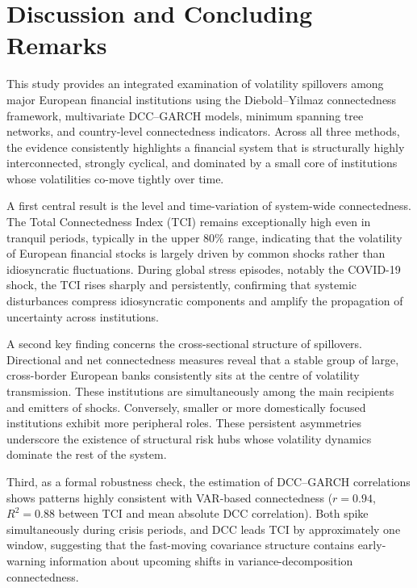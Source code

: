 \section{Discussion and Concluding Remarks}\label{sec:concl}

This study provides an integrated examination of volatility spillovers among major
European financial institutions using the Diebold--Yilmaz connectedness framework,
multivariate DCC--GARCH models, minimum spanning tree networks, and country-level
connectedness indicators. Across all three methods, the evidence consistently highlights
a financial system that is structurally highly interconnected, strongly cyclical, and
dominated by a small core of institutions whose volatilities co-move tightly over time.

A first central result is the level and time-variation of system-wide connectedness. The
Total Connectedness Index (TCI) remains exceptionally high even in tranquil periods,
typically in the upper $80\%$ range, indicating that the volatility of European financial
stocks is largely driven by common shocks rather than idiosyncratic fluctuations. During
global stress episodes, notably the COVID-19 shock, the TCI rises sharply and
persistently, confirming that systemic disturbances compress idiosyncratic components and
amplify the propagation of uncertainty across institutions.

A second key finding concerns the cross-sectional structure of spillovers. Directional
and net connectedness measures reveal that a stable group of large, cross-border European
banks consistently sits at the centre of volatility transmission. These institutions are
simultaneously among the main recipients and emitters of shocks. Conversely, smaller or
more domestically focused institutions exhibit more peripheral roles. These persistent
asymmetries underscore the existence of structural risk hubs whose volatility dynamics
dominate the rest of the system.

Third, as a formal robustness check, the estimation of DCC--GARCH correlations shows
patterns highly consistent with VAR-based connectedness ($r = 0.94$, $R^2 = 0.88$
between TCI and mean absolute DCC correlation). Both spike simultaneously during crisis
periods, and DCC leads TCI by approximately one window, suggesting that the fast-moving
covariance structure contains early-warning information about upcoming shifts in
variance-decomposition connectedness.

